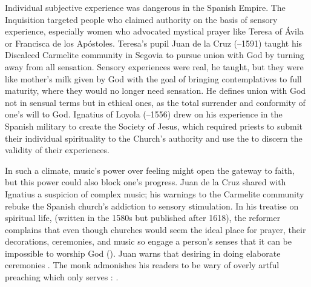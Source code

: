 Individual subjective experience was dangerous in the Spanish Empire.
The Inquisition targeted people who claimed authority on the basis of sensory
experience, especially women who advocated mystical prayer like Teresa of Ávila
or Francisca de los Apóstoles.%
    \Autocites
    {Ahlgren:TeresaPolitics}
    {Francisca:Inquisition}
    []{Schreiner:Certainty}
Teresa's pupil Juan de la Cruz (--1591) taught his Discalced
Carmelite community in Segovia to pursue union with God by turning away from
all sensation.
Sensory experiences were real, he taught, but they were like mother's milk
given by God with the goal of bringing contemplatives to full maturity, where
they would no longer need sensation.
He defines union with God not in sensual terms but in ethical ones, as the
total surrender and conformity of one's will to God.%
    \Autocite
    [, , ]
    {JuandelaCruz:Subida}
Ignatius of Loyola (--1556) drew on his experience in the Spanish
military to create the Society of Jesus, which required priests to submit their
individual spirituality to the Church's authority and use the  to discern the validity of their experiences.


In such a climate, music's power over feeling might open the gateway to faith,
but this power could also block one's progress.
Juan de la Cruz shared with Ignatius a suspicion of complex music; his
warnings to the Carmelite community rebuke the Spanish church's addiction to
sensory stimulation.
In his treatise on spiritual life,  (written
in the 1580s but published after 1618), the reformer complains that even though
churches would seem the ideal place for prayer, their decorations, ceremonies,
and music so engage a person's senses that it can be impossible to worship God
 ().
Juan warns that desiring  in doing
elaborate ceremonies .%
    \Autocite
    [, , ]
    {JuandelaCruz:Subida}
The monk admonishes his readers to be wary of overly artful preaching which
only serves :
.%
    \Autocite
    [, , ]
    {JuandelaCruz:Subida}

